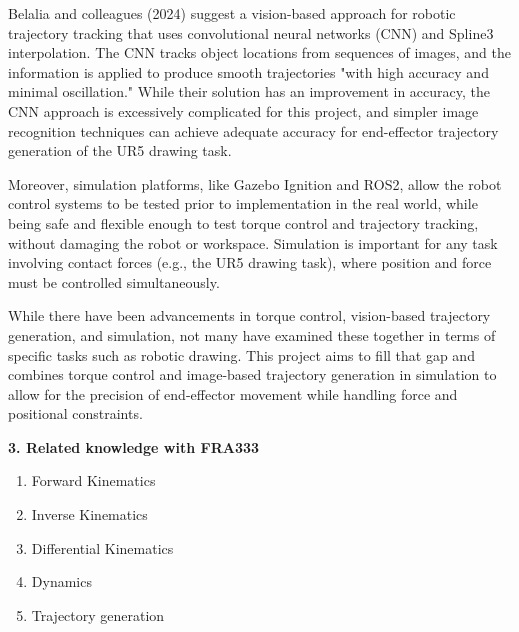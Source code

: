 \documentclass[10pt]{article}
\begin{document}
\indent Belalia and colleagues (2024) suggest a vision-based approach for robotic trajectory tracking that uses convolutional neural networks (CNN) and Spline3 interpolation. The CNN tracks object locations from sequences of images, and the information is applied to produce smooth trajectories "with high accuracy and minimal oscillation." While their solution has an improvement in accuracy, the CNN approach is excessively complicated for this project, and simpler image recognition techniques can achieve adequate accuracy for end-effector trajectory generation of the UR5 drawing task.

\indent Moreover, simulation platforms, like Gazebo Ignition and ROS2, allow the robot control systems to be tested prior to implementation in the real world, while being safe and flexible enough to test torque control and trajectory tracking, without damaging the robot or workspace. Simulation is important for any task involving contact forces (e.g., the UR5 drawing task), where position and force must be controlled simultaneously.

\indent While there have been advancements in torque control, vision-based trajectory generation, and simulation, not many have examined these together in terms of specific tasks such as robotic drawing. This project aims to fill that gap and combines torque control and image-based trajectory generation in simulation to allow for the precision of end-effector movement while handling force and positional constraints.

\large
\noindent
\textbf{3. Related knowledge with FRA333} \\
\normalsize
\begin{enumerate}[nosep, itemsep=-2pt]
    \item Forward Kinematics 
    \item Inverse Kinematics
    \item Differential Kinematics
    \item Dynamics
    \item Trajectory generation
\end{enumerate}

\newpage
\end{document}
